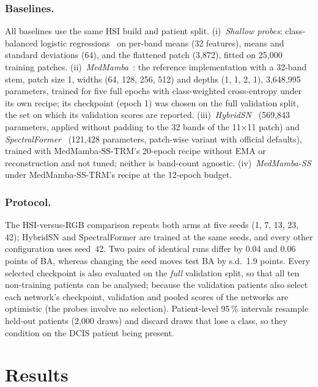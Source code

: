 \documentclass{svproc}
\begin{document}
\subsubsection{Baselines.}
All baselines use the same HSI build and patient split. (i)~\emph{Shallow probes}: class-balanced logistic regressions~\cite{sklearn} on per-band means (32 features), means and standard deviations (64), and the flattened patch (3,872), fitted on 25,000 training patches. (ii)~\emph{MedMamba}~\cite{medmamba}: the reference implementation with a 32-band stem, patch size 1, widths (64, 128, 256, 512) and depths (1, 1, 2, 1), 3,648,995 parameters, trained for five full epochs with class-weighted cross-entropy under its own recipe; its checkpoint (epoch 1) was chosen on the full validation split, the set on which its validation scores are reported. (iii)~\emph{HybridSN}~\cite{hybridsn} (569,843 parameters, applied without padding to the 32 bands of the 11$\times$11 patch) and \emph{SpectralFormer}~\cite{spectralformer} (121,428 parameters, patch-wise variant with official defaults), trained with MedMamba-SS-TRM's 20-epoch recipe without EMA or reconstruction and not tuned; neither is band-count agnostic. (iv)~\emph{MedMamba-SS} under MedMamba-SS-TRM's recipe at the 12-epoch budget.

\subsubsection{Protocol.}
The HSI-versus-RGB comparison repeats both arms at five seeds (1, 7, 13, 23, 42); HybridSN and SpectralFormer are trained at the same seeds, and every other configuration uses seed~42. Two pairs of identical runs differ by 0.04 and 0.06 points of BA, whereas changing the seed moves test BA by s.d.\ 1.9 points. Every selected checkpoint is also evaluated on the \emph{full} validation split, so that all ten non-training patients can be analysed; because the validation patients also select each network's checkpoint, validation and pooled scores of the networks are optimistic (the probes involve no selection). Patient-level 95\,\% intervals resample held-out patients (2,000 draws) and discard draws that lose a class, so they condition on the DCIS patient being present.

\section{Results}
\end{document}
